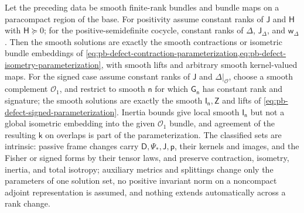Let the preceding data be smooth finite-rank bundles and bundle maps on a paracompact region of the
base. For positivity assume constant ranks of \(\mathsf J\) and \(\mathsf H\) with \(\mathsf H\succeq0\);
for the positive-semidefinite cocycle, constant ranks of \(\Delta\), \(\mathsf J_\Delta\), and
\(\mathsf w_\Delta\). Then the smooth solutions are exactly the smooth contractions or isometric bundle
embeddings of
\cref{eq:pb-defect-contraction-parameterization,eq:pb-defect-isometry-parameterization}, with smooth
lifts and arbitrary smooth kernel-valued maps. For the signed case assume constant ranks of
\(\mathsf J\) and \(\Delta|_{\mathcal O}\), choose a smooth complement \(\mathcal O_1\), and restrict to
smooth \(\mathsf n\) for which \(\mathsf G_{\mathsf n}\) has constant rank and signature; the smooth
solutions are exactly the smooth \(\mathsf I_{\mathsf n},\mathsf Z\) and lifts of
\eqref{eq:pb-defect-signed-parameterization}. Inertia bounds give local smooth \(\mathsf I_{\mathsf n}\)
but not a global isometric embedding into the given \(\mathcal O_1\) bundle, and agreement of the
resulting \(\mathsf k\) on overlaps is part of the parameterization. The classified sets are intrinsic:
passive frame changes carry \(\mathsf D,\Psi_*,\mathsf J,\mathsf p\), their kernels and images, and the
Fisher or signed forms by their tensor laws, and preserve contraction, isometry, inertia, and total
isotropy; auxiliary metrics and splittings change only the parameters of one solution set, no positive
invariant norm on a noncompact adjoint representation is assumed, and nothing extends automatically
across a rank change. 

